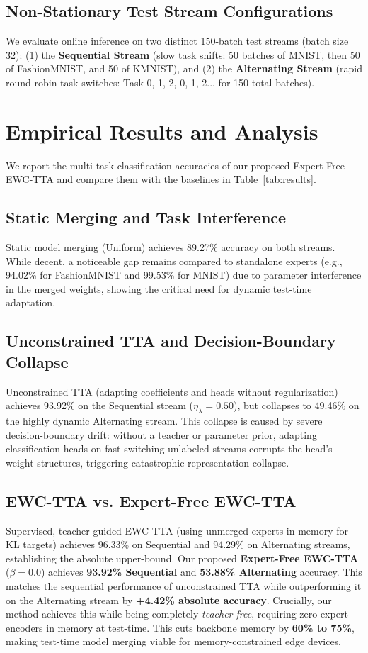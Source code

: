 \documentclass{article}
\theoremstyle{plain}
\theoremstyle{definition}
\theoremstyle{remark}
\begin{document}
\subsection{Non-Stationary Test Stream Configurations}
We evaluate online inference on two distinct 150-batch test streams (batch size 32): (1) the \textbf{Sequential Stream} (slow task shifts: 50 batches of MNIST, then 50 of FashionMNIST, and 50 of KMNIST), and (2) the \textbf{Alternating Stream} (rapid round-robin task switches: Task 0, 1, 2, 0, 1, 2... for 150 total batches).

\section{Empirical Results and Analysis}
\label{sec:results}

We report the multi-task classification accuracies of our proposed Expert-Free EWC-TTA and compare them with the baselines in Table~\ref{tab:results}.

\subsection{Static Merging and Task Interference}
Static model merging (Uniform) achieves 89.27\% accuracy on both streams. While decent, a noticeable gap remains compared to standalone experts (e.g., 94.02\% for FashionMNIST and 99.53\% for MNIST) due to parameter interference in the merged weights, showing the critical need for dynamic test-time adaptation.

\subsection{Unconstrained TTA and Decision-Boundary Collapse}
Unconstrained TTA (adapting coefficients and heads without regularization) achieves 93.92\% on the Sequential stream ($\eta_\lambda=0.50$), but collapses to 49.46\% on the highly dynamic Alternating stream. This collapse is caused by severe decision-boundary drift: without a teacher or parameter prior, adapting classification heads on fast-switching unlabeled streams corrupts the head's weight structures, triggering catastrophic representation collapse.

\subsection{EWC-TTA vs. Expert-Free EWC-TTA}
Supervised, teacher-guided EWC-TTA (using unmerged experts in memory for KL targets) achieves 96.33\% on Sequential and 94.29\% on Alternating streams, establishing the absolute upper-bound.
Our proposed \textbf{Expert-Free EWC-TTA} ($\beta=0.0$) achieves \textbf{93.92\% Sequential} and \textbf{53.88\% Alternating} accuracy. This matches the sequential performance of unconstrained TTA while outperforming it on the Alternating stream by \textbf{+4.42\% absolute accuracy}. Crucially, our method achieves this while being completely \textit{teacher-free}, requiring zero expert encoders in memory at test-time. This cuts backbone memory by \textbf{60\% to 75\%}, making test-time model merging viable for memory-constrained edge devices.
\end{document}
